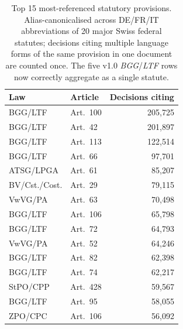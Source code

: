 \begin{table}[t]
\centering
\caption{Top 15 most-referenced statutory provisions. Alias-canonicalised across DE/FR/IT abbreviations of 20 major Swiss federal statutes; decisions citing multiple language forms of the same provision in one document are counted once. The five v1.0 \emph{BGG}/\emph{LTF} rows now correctly aggregate as a single statute.}
\label{tab:top_statutes}
\small
\begin{tabular}{l l r}
\toprule
\textbf{Law} & \textbf{Article} & \textbf{Decisions citing} \\
\midrule
BGG/LTF & Art.\ 100 & 205,725 \\
BGG/LTF & Art.\ 42 & 201,897 \\
BGG/LTF & Art.\ 113 & 122,514 \\
BGG/LTF & Art.\ 66 & 97,701 \\
ATSG/LPGA & Art.\ 61 & 85,207 \\
BV/Cst./Cost. & Art.\ 29 & 79,115 \\
VwVG/PA & Art.\ 63 & 70,498 \\
BGG/LTF & Art.\ 106 & 65,798 \\
BGG/LTF & Art.\ 72 & 64,793 \\
VwVG/PA & Art.\ 52 & 64,246 \\
BGG/LTF & Art.\ 82 & 62,398 \\
BGG/LTF & Art.\ 74 & 62,217 \\
StPO/CPP & Art.\ 428 & 59,567 \\
BGG/LTF & Art.\ 95 & 58,055 \\
ZPO/CPC & Art.\ 106 & 56,092 \\
\bottomrule
\end{tabular}
\end{table}
